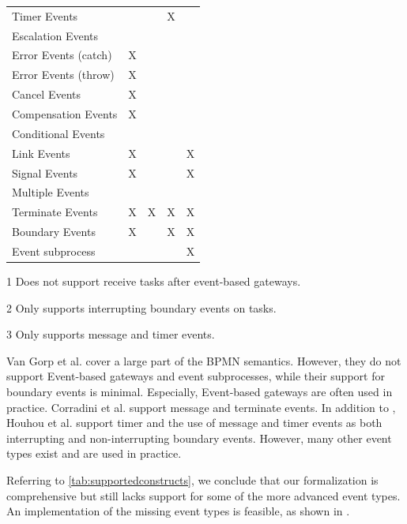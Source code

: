 \documentclass[submission, copyright, creativecommons]{eptcs}
\begin{document}
\begin{table}[htbp]
\begin{threeparttable}
\begin{tabular}{l l l l l}
      Timer Events & & & X & \\
      Escalation Events & & & & \\
      Error Events (catch) & X & & &\\
      Error Events (throw) & X & & &\\
      Cancel Events & X & & &\\
      Compensation Events & X & & &\\
      Conditional Events & & & &\\
      Link Events & X & & & X\\
      Signal Events & X & & & X\\
      Multiple Events &  & & & \\
      Terminate Events & X & X & X & X\\
     Boundary Events & X\tnote{2} & & X\tnote{3} & X\\ %
      Event subprocess &  &  &  & X\\
    \end{tabular}
    \begin{tablenotes}
        \item[1] Does not support receive tasks after event-based gateways.
        \item[2] Only supports interrupting boundary events on tasks.
        \item[3] Only supports message and timer events.
    \end{tablenotes}
    \end{threeparttable}
\end{table}

Van Gorp et al. \cite{vangorpVisualTokenbasedFormalization2013} cover a large part of the BPMN semantics.
However, they do not support Event-based gateways and event subprocesses, while their support for boundary events is minimal.
Especially, Event-based gateways are often used in practice.
Corradini et al. \cite{corradiniFormalApproachAnalysis2021} support message and terminate events.
In addition to \cite{corradiniFormalApproachAnalysis2021}, Houhou et al. \cite{houhouFirstOrderLogicVerification2022} support timer and the use of message and timer events as both interrupting and non-interrupting boundary events.
However, many other event types exist and are used in practice.

Referring to \cref{tab:supportedconstructs}, we conclude that our formalization is comprehensive but still lacks support for some of the more advanced event types.
An implementation of the missing event types is feasible, as shown in \cite{vangorpVisualTokenbasedFormalization2013}.
\end{document}
